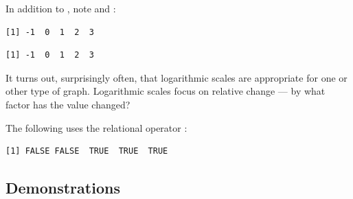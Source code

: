 In addition to , note  and :
\begin{knitrout}
\color{fgcolor}\begin{kframe}
\begin{alltt}
\hlstd{(}\hlstd{(}\hlstd{,} \hlstd{,} \hlstd{,} \hlstd{,} \hlstd{))}
\end{alltt}
\begin{verbatim}
[1] -1  0  1  2  3
\end{verbatim}
\begin{alltt}
\hlstd{(}\hlstd{(}\hlstd{,} \hlstd{,} \hlstd{,} \hlstd{,} \hlstd{))}
\end{alltt}
\begin{verbatim}
[1] -1  0  1  2  3
\end{verbatim}
\end{kframe}
\end{knitrout}
\noindent
It turns out, surprisingly often, that logarithmic scales are
appropriate for one or other type of graph.  Logarithmic scales focus
on relative change --- by what factor has the value changed?

The following uses the relational operator \code{$>$}:
\begin{knitrout}
\color{fgcolor}\begin{kframe}
\begin{alltt}
\hlstd{(}\hlopt{:}\hlstd{)} \hlopt{>}   
\end{alltt}
\begin{verbatim}
[1] FALSE FALSE  TRUE  TRUE  TRUE
\end{verbatim}
\end{kframe}
\end{knitrout}

\subsection*{Demonstrations}

